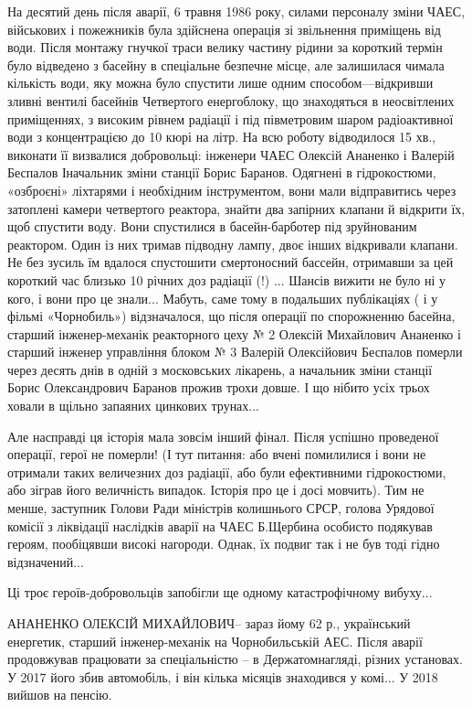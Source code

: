 На десятий день після аварії, 6 травня 1986 року, силами персоналу зміни ЧАЕС,
військових і пожежників була здійснена операція зі звільнення приміщень від
води. Після монтажу гнучкої траси велику частину рідини за короткий термін було
відведено з басейну в спеціальне безпечне місце, але залишилася чимала
кількість води, яку можна було спустити лише одним способом—відкривши зливні
вентилі басейнів Четвертого енергоблоку, що знаходяться в неосвітлених
приміщеннях, з високим рівнем радіації і під півметровим шаром радіоактивної
води з концентрацією до 10 кюрі на літр. На всю роботу відводилося 15 хв.,
виконати її визвалися добровольці: інженери ЧАЕС  Олексій Ананенко і Валерій
Беспалов Іначальник зміни станції Борис Баранов. Одягнені в гідрокостюми,
«озброєні» ліхтарями і необхідним інструментом, вони мали відправитись через
затоплені камери четвертого реактора, знайти два запірних клапани й відкрити
їх, щоб спустити воду. Вони спустилися в басейн-барботер під зруйнованим
реактором. Один із них тримав підводну лампу,  двоє інших відкривали клапани.
Не без зусиль їм вдалося спустошити смертоносний бассейн, отримавши за цей
короткий час близько 10 річних доз радіації (!) ... Шансів вижити не було ні у
кого, і вони про це знали... Мабуть,  саме тому в подальших публікаціях ( і у
фільмі «Чорнобиль») відзначалося, що після операції по спорожненню басейна,
старший інженер-механік реакторного цеху № 2 Олексій Михайлович Ананенко і
старший інженер управління блоком № 3 Валерій Олексійович Беспалов померли
через десять днів в одній з московських лікарень, а начальник зміни станції
Борис Олександрович Баранов прожив трохи довше. І що нібито усіх трьох ховали в
щільно запаяних цинкових трунах... 

Але насправді ця історія мала  зовсім інший фінал. Після успішно проведеної
операції, герої не померли!  (І тут питання: або вчені помилилися і вони не
отримали таких величезних доз радіації, або були ефективними гідрокостюми, або
зіграв його величність випадок. Історія про це і досі мовчить). Тим не менше,
заступник Голови Ради міністрів колишнього СРСР, голова Урядової комісії з
ліквідації наслідків аварії на ЧАЕС Б.Щербина особисто подякував героям,
пообіцявши високі нагороди. Однак, їх подвиг так і не був тоді гідно
відзначений... 


Ці троє героїв-добровольців  запобігли ще одному  катастрофічному вибуху...

АНАНЕНКО ОЛЕКСІЙ МИХАЙЛОВИЧ– зараз йому 62 р., український енергетик, старший
інженер-механік   на Чорнобильській АЕС. Після аварії продовжував працювати  за
спеціальністю – в Держатомнагляді, різних установах. У 2017 його збив
автомобіль, і він кілька місяців знаходився у комі... У 2018 вийшов на пенсію.

